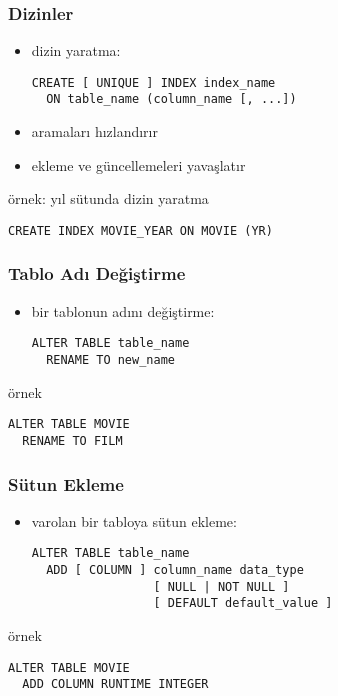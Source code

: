 \documentclass[dvipsnames]{beamer}
\theoremstyle{plain}
\begin{document}
\begin{frame}[fragile]
  \frametitle{Dizinler}

  \begin{itemize}
    \item dizin yaratma:
    \begin{lstlisting}
CREATE [ UNIQUE ] INDEX index_name
  ON table_name (column_name [, ...])
    \end{lstlisting}

    \smallskip
    \item aramaları hızlandırır
    \item ekleme ve güncellemeleri yavaşlatır
  \end{itemize}

  \begin{exampleblock}{örnek: yıl sütunda dizin yaratma}
    \begin{lstlisting}
CREATE INDEX MOVIE_YEAR ON MOVIE (YR)
    \end{lstlisting}
  \end{exampleblock}
\end{frame}

\begin{frame}[fragile]
  \frametitle{Tablo Adı Değiştirme}

  \begin{itemize}
    \item bir tablonun adını değiştirme:
    \begin{lstlisting}
ALTER TABLE table_name
  RENAME TO new_name
    \end{lstlisting}
  \end{itemize}

  \medskip
  \begin{exampleblock}{örnek}
    \begin{lstlisting}
ALTER TABLE MOVIE
  RENAME TO FILM
    \end{lstlisting}
  \end{exampleblock}
\end{frame}

\begin{frame}[fragile]
  \frametitle{Sütun Ekleme}

  \begin{itemize}
    \item varolan bir tabloya sütun ekleme:
    \begin{lstlisting}
ALTER TABLE table_name
  ADD [ COLUMN ] column_name data_type
                 [ NULL | NOT NULL ]
                 [ DEFAULT default_value ]
    \end{lstlisting}
  \end{itemize}

  \medskip
  \begin{exampleblock}{örnek}
    \begin{lstlisting}
ALTER TABLE MOVIE
  ADD COLUMN RUNTIME INTEGER
    \end{lstlisting}
  \end{exampleblock}
\end{frame}
\end{document}
